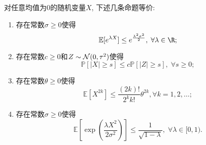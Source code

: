 \begin{theorem}[次高斯随机变量的等价定义]
	对任意均值为$0$的随机变量$X$, 下述几条命题等价: 
	\begin{enumerate}[label=(\Roman*)]
		\item 存在常数$\sigma \geq 0$使得
			\begin{equation*}
				\mathbb{E}[e^{\lambda X} ] \leq e^{\frac{\lambda^2 \sigma^2}{2}},\; \forall \lambda \in \R; 
			\end{equation*}
		\item 存在常数$c \geq 0$和$Z \sim \mathcal{N}(0, \tau^2)$使得
			\begin{equation*}
				\mathbb{P}[|X| \geq s] \leq c \mathbb{P}[|Z| \geq s],\; \forall s \geq 0; 
			\end{equation*}
		\item 存在常数$\theta \geq 0$使得
			\begin{equation*}
				\mathbb{E}[X^{2k}] \leq \frac{(2k)!}{2^k k!} \theta^{2k}, \forall k = 1,2,\dots;
			\end{equation*}
		\item 存在常数$\sigma \geq 0$使得
			\begin{equation*}
				\mathbb{E}\left[ \exp\left(\frac{\lambda X^2}{2 \sigma^2}\right) \right] \leq \frac{1}{\sqrt{1 - \lambda}},\; \forall \lambda \in [0,1).
			\end{equation*}
	\end{enumerate}
\end{theorem}

